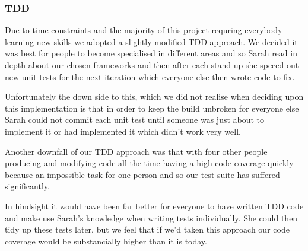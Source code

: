   \subsubsection{TDD}
    Due to time constraints and the majority of this project requring everybody learning new skills we adopted a slightly modified TDD approach. We decided it was best for people to become specialised in different areas and so Sarah read in depth about our chosen frameworks and then after each stand up she speced out new unit tests for the next iteration which everyone else then wrote code to fix.

    Unfortunately the down side to this, which we did not realise when deciding upon this implementation is that in order to keep the build unbroken for everyone else Sarah could not commit each unit test until someone was just about to implement it or had implemented it which didn't work very well.

    Another downfall of our TDD approach was that with four other people producing and modifying code all the time having a high code coverage quickly because an impossible task for one person and so our test suite has suffered significantly.

    In hindsight it would have been far better for everyone to have written TDD code and make use Sarah's knowledge when writing tests individually. She could then tidy up these tests later, but we feel that if we'd taken this approach our code coverage would be substancially higher than it is today.
